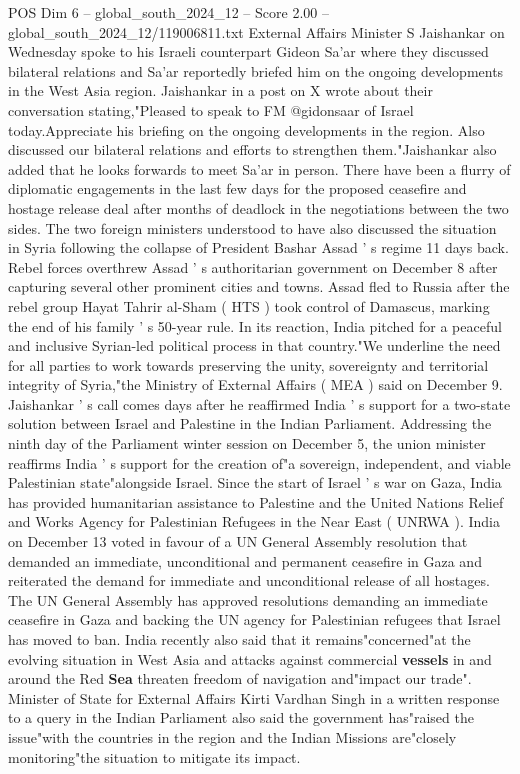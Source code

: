 \begin{textsample}{POS Dim 6 – global\_south\_2024\_12 – Score 2.00 – global\_south\_2024\_12/119006811.txt}  \label{ex:f6_pos_436}
External Affairs Minister S Jaishankar on Wednesday spoke to his Israeli counterpart Gideon Sa'ar where they discussed bilateral relations and Sa'ar reportedly briefed him on the ongoing developments in the West Asia region.
Jaishankar in a post on X wrote about their conversation stating,"Pleased to speak to FM @gidonsaar of Israel today.Appreciate his briefing on the ongoing developments in the region.
Also discussed our bilateral relations and efforts to strengthen them."Jaishankar also added that he looks forwards to meet Sa'ar in person.
There have been a flurry of diplomatic engagements in the last few days for the proposed ceasefire and hostage release deal after months of deadlock in the negotiations between the two sides.
The two foreign ministers understood to have also discussed the situation in Syria following the collapse of President Bashar Assad ' s regime 11 days back.
Rebel forces overthrew Assad ' s authoritarian government on December 8 after capturing several other prominent cities and towns.
Assad fled to Russia after the rebel group Hayat Tahrir al-Sham ( HTS ) took control of Damascus, marking the end of his family ' s 50-year rule.
In its reaction, India pitched for a peaceful and inclusive Syrian-led political process in that country."We underline the need for all parties to work towards preserving the unity, sovereignty and territorial integrity of Syria,"the Ministry of External Affairs ( MEA ) said on December 9.
Jaishankar ' s call comes days after he reaffirmed India ' s support for a two-state solution between Israel and Palestine in the Indian Parliament.
Addressing the ninth day of the Parliament winter session on December 5, the union minister reaffirms India ' s support for the creation of"a sovereign, independent, and viable Palestinian state"alongside Israel.
Since the start of Israel ' s war on Gaza, India has provided humanitarian assistance to Palestine and the United Nations Relief and Works Agency for Palestinian Refugees in the Near East ( UNRWA ).
India on December 13 voted in favour of a UN General Assembly resolution that demanded an immediate, unconditional and permanent ceasefire in Gaza and reiterated the demand for immediate and unconditional release of all hostages.
The UN General Assembly has approved resolutions demanding an immediate ceasefire in Gaza and backing the UN agency for Palestinian refugees that Israel has moved to ban.
India recently also said that it remains"concerned"at the evolving situation in West Asia and attacks against commercial \textbf{vessels} in and around the Red \textbf{Sea} threaten freedom of navigation and"impact our trade".
Minister of State for External Affairs Kirti Vardhan Singh in a written response to a query in the Indian Parliament also said the government has"raised the issue"with the countries in the region and the Indian Missions are"closely monitoring"the situation to mitigate its impact.

\end{textsample}
